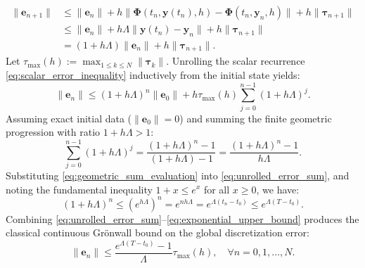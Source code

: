 \documentclass[11pt,a4paper]{article}
\theoremstyle{definition}
\theoremstyle{remark}
\begin{document}
\begin{align}
\|\mathbf{e}_{n+1}\| &\le \|\mathbf{e}_n\| + h \|\mathbf{\Phi}(t_n, \mathbf{y}(t_n), h) - \mathbf{\Phi}(t_n, \mathbf{y}_n, h)\| + h \|\boldsymbol{\tau}_{n+1}\| \nonumber \\
&\le \|\mathbf{e}_n\| + h \Lambda \|\mathbf{y}(t_n) - \mathbf{y}_n\| + h \|\boldsymbol{\tau}_{n+1}\| \nonumber \\
&= (1 + h \Lambda) \|\mathbf{e}_n\| + h \|\boldsymbol{\tau}_{n+1}\|. \label{eq:scalar_error_inequality}
\end{align}
Let $\tau_{\max}(h) := \max_{1 \le k \le N} \|\boldsymbol{\tau}_k\|$. Unrolling the scalar recurrence \eqref{eq:scalar_error_inequality} inductively from the initial state yields:
\begin{equation}
\label{eq:unrolled_error_sum}
\|\mathbf{e}_n\| \le (1 + h\Lambda)^n \|\mathbf{e}_0\| + h \tau_{\max}(h) \sum_{j=0}^{n-1} (1 + h\Lambda)^j.
\end{equation}
Assuming exact initial data ($\|\mathbf{e}_0\| = 0$) and summing the finite geometric progression with ratio $1 + h\Lambda > 1$:
\begin{equation}
\label{eq:geometric_sum_evaluation}
\sum_{j=0}^{n-1} (1 + h\Lambda)^j = \frac{(1 + h\Lambda)^n - 1}{(1 + h\Lambda) - 1} = \frac{(1 + h\Lambda)^n - 1}{h\Lambda}.
\end{equation}
Substituting \eqref{eq:geometric_sum_evaluation} into \eqref{eq:unrolled_error_sum}, and noting the fundamental inequality $1 + x \le e^x$ for all $x \ge 0$, we have:
\begin{equation}
\label{eq:exponential_upper_bound}
(1 + h\Lambda)^n \le \left(e^{h\Lambda}\right)^n = e^{n h \Lambda} = e^{\Lambda (t_n - t_0)} \le e^{\Lambda(T - t_0)}.
\end{equation}
Combining \eqref{eq:unrolled_error_sum}--\eqref{eq:exponential_upper_bound} produces the classical continuous Gr\"onwall bound on the global discretization error:
\begin{equation}
\label{eq:global_convergence_bound}
\|\mathbf{e}_n\| \le \frac{e^{\Lambda(T - t_0)} - 1}{\Lambda} \tau_{\max}(h), \quad \forall n = 0, 1, \dots, N.
\end{equation}
\end{document}

